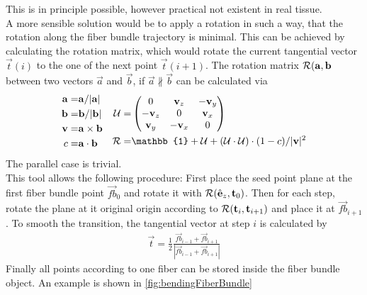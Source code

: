 This is in principle possible, however practical not existent in real tissue.
\\
A more sensible solution would be to apply a rotation in such a way, that the rotation along the fiber bundle trajectory is minimal.
This can be achieved by calculating the rotation matrix, which would rotate the current tangential vector $\vec{t}(i)$ to the one of the next point $\vec{t}(i+1)$.
The rotation matrix $\mathcal{R}(\mathbf{a}, \mathbf{b}$ between two vectors $\vec{a}$ and $\vec{b}$, if $\vec{a} \nparallel \vec{b}$ can be calculated via
\begin{align}
\begin{split}
    \vec{a} =& \vec{a} / |\vec{a}|\\
    \vec{b} =& \vec{b} / |\vec{b}|\\
    \vec{v} =& \vec{a} \times \vec{b}\\
    c =& \vec{a} \cdot \vec{b}
\end{split}
\quad
\begin{split}
    \mat{U} =& \begin{pmatrix} 0 & \vec{v}_z & -\vec{v}_y\\ -\vec{v}_z & 0 & \vec{v}_x\\ \vec{v}_y & -\vec{v}_x & 0\end{pmatrix}\\
    \mat{R} =& \mathbb{1} + \mat{U} + (\mat{U} \cdot \mat{U}) \cdot (1 - c) / |\vec{v}|^2
\end{split}
\end{align}
The parallel case is trivial.
\\
This tool allows the following procedure:
First place the seed point plane at the first fiber bundle point $\vec{fb}_0$ and rotate it with $\mathcal{R}(\hat{\mathbf{e}}_z, \mathbf{t}_0)$.
Then for each step, rotate the plane at it original origin according to $\mathcal{R}(\mathbf{t}_i, \mathbf{t}_{i+1})$ and place it at $\vec{fb}_{i+1}$.
To smooth the transition, the tangential vector at step $i$ is calculated by
\begin{align}
    \vec{t} = \frac{1}{2} \frac{\vec{fb}_{i-1} + \vec{fb}_{i+1}}{|\vec{fb}_{i-1} + \vec{fb}_{i+1}|}
\end{align}
% 
Finally all points according to one fiber can be stored inside the fiber bundle object.
An example is shown in \cref{fig:bendingFiberBundle}
% 
% 
% 
